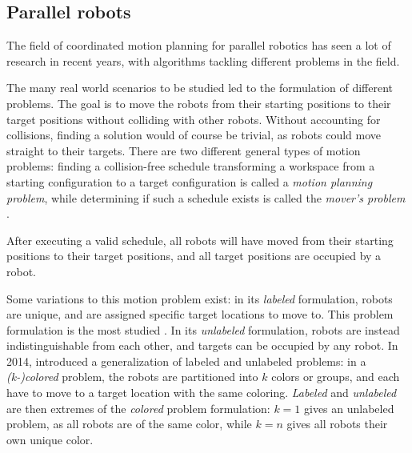 \subsection{Parallel robots}

The field of coordinated motion planning for parallel robotics has seen a lot of research in recent years, with algorithms tackling different problems in the field. 

The many real world scenarios to be studied led to the formulation of different problems. The goal is to move the robots from their starting positions to their target positions without colliding with other robots. Without accounting for collisions, finding a solution would of course be trivial, as robots could move straight to their targets. There are two different general types of motion problems: finding a collision-free schedule transforming a workspace from a starting configuration to a target configuration is called a \emph{motion planning problem}, while determining if such a schedule exists is called the \emph{mover's problem} \cite{siamcomp/HopcroftW86}. 

After executing a valid schedule, all robots will have moved from their starting positions to their target positions, and all target positions are occupied by a robot.

Some variations to this motion problem exist: in its \emph{labeled} formulation, robots are unique, and are assigned specific target locations to move to. This problem formulation is the most studied \cite{fun/BrockenHKLS21}. In its \emph{unlabeled} formulation, robots are instead indistinguishable from each other, and targets can be occupied by any robot. In 2014, \cite{ijrr/SoloveyH14} introduced a generalization of labeled and unlabeled problems: in a \emph{(k-)colored} problem, the robots are partitioned into $k$ colors or groups, and each have to move to a target location with the same coloring. \emph{Labeled} and \emph{unlabeled} are then extremes of the \emph{colored} problem formulation: $k=1$ gives an unlabeled problem, as all robots are of the same color, while $k=n$ gives all robots their own unique color. 



